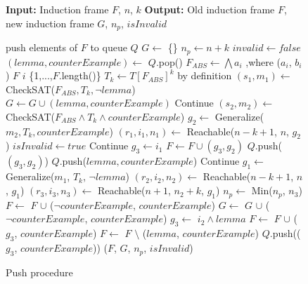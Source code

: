 \begin{figure}[H]
    \begin{mdframed}
        \begin{algorithmic}[1]
            \State \textbf{Input:} Induction frame $F$, $n$, $k$
            \State \textbf{Output:} Old induction frame $F$, new induction frame $G$, $n_p$, $isInvalid$

            \State push elements of $F$ to queue $Q$
            \State $G \gets$ \{\}
            \State $n_p \gets n + k$
            \State $invalid \gets false$
                \State $(lemma, counterExample)  \gets$ $Q$.pop()
                \State $F_{ABS} \gets \bigwedge a_i$ ,where ($a_i$, $b_i$) \in $F$ \forall $i$ \in \{1,...,$F$.length()\}
                \State $T_k \gets T[F_{ABS}]^k$ by definition
                \State $(s_1, m_1) \gets$ CheckSAT($F_{ABS}, T_k, \neg lemma$)
                    \State $G \gets G \cup (lemma, counterExample)$
                    \State Continue
                \EndIf
                \State $(s_2, m_2) \gets$ CheckSAT($F_{ABS} \wedge T_k \wedge counterExample$)
                    \State $ g_2 \gets $ Generalize($m_2, T_k, counterExample$)
                    \State $(r_1, i_1, n_1) \gets $ Reachable($n-k+1$, $n$, $g_2$)
                        \State $ isInvalid \gets true $
                        \State Continue
                    \Else
                        \State $g_3 \gets i_1$
                        \State $F \gets F \cup (g_3, g_2)$
                        \State $Q$.push($(g_3, g_2)$)
                        \State $Q$.push($lemma, counterExample$)
                        \State Continue
                    \EndIf
                \EndIf
                \State $g_1 \gets$ Generalize($m_1$, $T_k$, $\neg lemma$)
                \State $(r_2, i_2, n_2) \gets $ Reachable($n-k+1$, $n$, $g_1$)
                    \State $(r_3, i_3, n_3) \gets $ Reachable($n+1$, $n_2 + k$, $g_1$)
                    \State $n_p \gets $ Min($n_p$, $n_3$)
                    \State $F \gets$ $F$ $\cup $ ($\neg counterExample$, $counterExample$)
                    \State $G \gets$ $G$ $\cup $ ($\neg counterExample$, $counterExample$)
                \Else
                    \State $g_3 \gets$ $i_2 \wedge lemma$
                    \State $F \gets$ $F$ $\cup $ ($g_3$, $counterExample$)
                    \State $F \gets$ $F$ $\setminus $ ($lemma$, $counterExample$)
                    \State $Q$.push(($g_3$, $counterExample$))
                \EndIf
                \State \Return ($F$, $G$, $n_p$, $isInvalid$)
            \EndWhile

        \end{algorithmic}
    \end{mdframed}
    \caption{Push procedure}\label{alg:3}
\end{figure}

